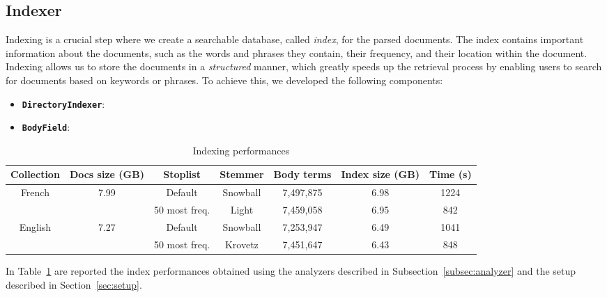 \subsection{Indexer}
\label{subsec:indexer}

Indexing is a crucial step where we create a searchable database, called \emph{index}, for the parsed documents. The index contains important information about the documents, 
such as the words and phrases they contain, their frequency, and their location within the document. 
Indexing allows us to store the documents in a \emph{structured} manner, which greatly speeds up the retrieval process by enabling users to search for documents based on keywords or phrases. To achieve this, we developed the following components:

\begin{itemize}
    \item \textbf{\texttt{DirectoryIndexer}}: 
    \\
    \item \textbf{\texttt{BodyField}}: 
\end{itemize}

\begin{table}[b]
    \caption{Indexing performances}
    \label{tab:index-perf}
    \centering
    \begin{tabular}{|c|c|c|c|c|c|c|}
        \toprule
        \textbf{Collection} & \textbf{Docs size} (GB) & \textbf{Stoplist} & \textbf{Stemmer} & \textbf{Body terms} & \textbf{Index size} (GB) & \textbf{Time} (s)  \\
        \midrule
        French & 7.99 & Default & Snowball & 7,497,875 & 6.98 & 1224\\
        & & 50 most freq. & Light & 7,459,058 & 6.95 & 842\\
        \midrule
        English & 7.27 & Default & Snowball & 7,253,947 & 6.49 & 1041 \\
        & & 50 most freq. & Krovetz & 7,451,647 & 6.43 & 848 \\
        \bottomrule
    \end{tabular}
\end{table}

In Table~\ref{tab:index-perf} are reported the index performances obtained using the analyzers described in Subsection~\ref{subsec:analyzer} and the setup described in Section~\ref{sec:setup}.